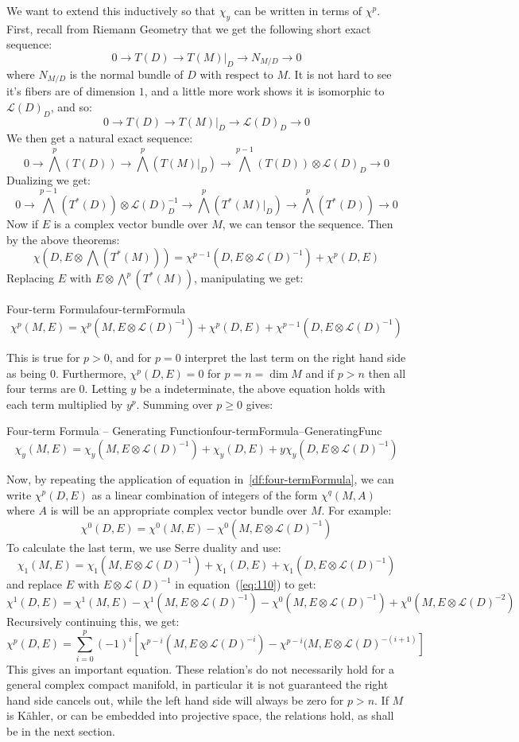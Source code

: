 \documentclass{ut-thesis}
\newcommand{\CL}{{\mathcal{L}}}
\begin{document}
We want to extend this inductively so that $\chi_y$ can be written in terms of $\chi^p$. First, recall from
Riemann Geometry that we get the following short exact sequence:
\[
  0 \to T(D) \to T(M)|_D \to N_{M/D} \to 0
\]
where $N_{M/D}$ is the normal bundle of $D$ with respect to $M$. It is not hard to see it's fibers are of
dimension $1$, and a little more work shows it is isomorphic to $\CL(D)_D$, and so:
\[
  0 \to T(D) \to T(M)|_D \to \CL(D)_D \to 0
\]
We then get a natural exact sequence:
\[
0 \to \bigwedge^p\left(T(D)\right) \to \bigwedge^p(T(M)|_D) \to \bigwedge^{p-1}(T(D)) \otimes \CL(D)_D\to 0
\]
Dualizing we get:
\[
  0 \to \bigwedge^{p-1}(T^*(D))\otimes \CL(D)_D^{-1} \to \bigwedge^p(T^*(M)|_D) \to \bigwedge^p(T^*(D)) \to 0
\]
Now if $E$ is a complex vector bundle over $M$, we can tensor the sequence. Then by the above theorems:
\[
  \chi\left(D, E\otimes \bigwedge(T^*(M))\right) = \chi^{p-1}(D, E\otimes \CL(D)^{-1}) + \chi^p(D, E)
\]
Replacing $E$ with $E\otimes \bigwedge^p(T^*(M))$, manipulating we get:
\begin{defn}{Four-term Formula}{four-termFormula}
  \[
  \chi^p(M,E) = \chi^p(M, E\otimes \CL(D)^{-1}) + \chi^p(D, E) + \chi^{p-1}(D, E\otimes \CL(D)^{-1})
  \]
\end{defn}
This is true for $p>0$, and for $p=0$ interpret the last term on the right hand side as being $0$.
Furthermore, $\chi^p(D, E)=0$ for $p = n = \dim M$ and if $p > n$ then all four terms are $0$. Letting $y$ be
a indeterminate, the above equation holds with each term multiplied by $y^p$. Summing over $p\ge 0$ gives:
\begin{defn}{Four-term Formula -- Generating Function}{four-termFormula--GeneratingFunc}
  \[
  \chi_y(M,E) = \chi_y(M, E\otimes \CL(D)^{-1}) + \chi_y(D, E) + y\chi_y(D, E\otimes \CL(D)^{-1})
\]
\end{defn}


Now, by repeating the application of equation in~\cref{df:four-termFormula}, we can write $\chi^p(D,E)$ as a linear
combination of integers of the form $\chi^q(M, A)$ where $A$ is will be an appropriate complex vector bundle over $M$. For example:
\begin{equation}\label{eq:110}
  \chi^0(D, E) = \chi^0(M,E) - \chi^0(M, E\otimes \CL(D)^{-1})
\end{equation}
To calculate the last term, we use Serre duality and use:
\[
  \chi_1(M,E) = \chi_1(M, E\otimes \CL(D)^{-1}) + \chi_1(D, E) + \chi_1(D, E\otimes \CL(D)^{-1})
\]
and replace $E$ with $E\otimes \CL(D)^{-1}$ in equation~(\ref{eq:110}) to get:
\[
  \chi^1(D,E) = \chi^1(M, E) - \chi^1(M, E\otimes \CL(D)^{-1}) - \chi^0(M, E\otimes \CL(D)^{-1}) + \chi^0(M,
  E\otimes \CL(D)^{-2})
\]
Recursively continuing this, we get:
\[
  \chi^p(D, E) = \sum_{i=0}^p (-1)^i [\chi^{p-i}(M, E\otimes \CL(D)^{-i}) - \chi^{p-i}(M, E\otimes
  \CL(D)^{-(i+1)}]
\]
This gives an important equation. These relation's do not necessarily hold for a general complex compact
manifold, in particular it is not guaranteed the right hand side cancels out, while the left hand side
will always be zero for $p> n$. If $M$ is K\"ahler, or can be embedded into projective space, the relations
hold, as shall be in the next section.
\end{document}
